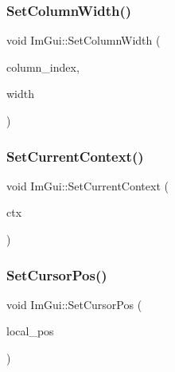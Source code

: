 \mbox{\label{namespace_im_gui_af17222ec47aebb5ede00be7b52de9f5d}} 
\subsubsection{\texorpdfstring{Set\+Column\+Width()}{SetColumnWidth()}}
{\footnotesize\ttfamily void Im\+Gui\+::\+Set\+Column\+Width (\begin{DoxyParamCaption}\item[{int}]{column\+\_\+index,  }\item[{float}]{width }\end{DoxyParamCaption})}

\mbox{\label{namespace_im_gui_a289dbbbffdadcf1231821d97a7c4a9be}} 
\subsubsection{\texorpdfstring{Set\+Current\+Context()}{SetCurrentContext()}}
{\footnotesize\ttfamily void Im\+Gui\+::\+Set\+Current\+Context (\begin{DoxyParamCaption}\item[{\mbox{\hyperlink{struct_im_gui_context}{Im\+Gui\+Context}} $\ast$}]{ctx }\end{DoxyParamCaption})}

\mbox{\label{namespace_im_gui_a51ea13c986360d8a2e868dc9eeac2115}} 
\subsubsection{\texorpdfstring{Set\+Cursor\+Pos()}{SetCursorPos()}}
{\footnotesize\ttfamily void Im\+Gui\+::\+Set\+Cursor\+Pos (\begin{DoxyParamCaption}\item[{const \mbox{\hyperlink{struct_im_vec2}{Im\+Vec2}} \&}]{local\+\_\+pos }\end{DoxyParamCaption})}

\mbox{\label{namespace_im_gui_a8f56616f8d0b35e6e756c0b7f198ac0f}} 
